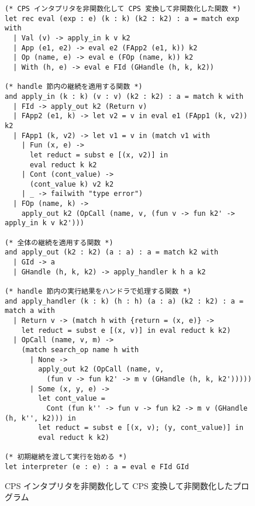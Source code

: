 \begin{figure}
\begin{spacing}{0.9}
\begin{verbatim}
(* CPS インタプリタを非関数化して CPS 変換して非関数化した関数 *)
let rec eval (exp : e) (k : k) (k2 : k2) : a = match exp with
  | Val (v) -> apply_in k v k2
  | App (e1, e2) -> eval e2 (FApp2 (e1, k)) k2
  | Op (name, e) -> eval e (FOp (name, k)) k2
  | With (h, e) -> eval e FId (GHandle (h, k, k2))

(* handle 節内の継続を適用する関数 *)
and apply_in (k : k) (v : v) (k2 : k2) : a = match k with
  | FId -> apply_out k2 (Return v)
  | FApp2 (e1, k) -> let v2 = v in eval e1 (FApp1 (k, v2)) k2
  | FApp1 (k, v2) -> let v1 = v in (match v1 with
    | Fun (x, e) ->
      let reduct = subst e [(x, v2)] in
      eval reduct k k2
    | Cont (cont_value) ->
      (cont_value k) v2 k2
    | _ -> failwith "type error")
  | FOp (name, k) ->
    apply_out k2 (OpCall (name, v, (fun v -> fun k2' -> apply_in k v k2')))

(* 全体の継続を適用する関数 *)
and apply_out (k2 : k2) (a : a) : a = match k2 with
  | GId -> a
  | GHandle (h, k, k2) -> apply_handler k h a k2

(* handle 節内の実行結果をハンドラで処理する関数 *)
and apply_handler (k : k) (h : h) (a : a) (k2 : k2) : a = match a with
  | Return v -> (match h with {return = (x, e)} ->
    let reduct = subst e [(x, v)] in eval reduct k k2)
  | OpCall (name, v, m) ->
    (match search_op name h with
      | None ->
        apply_out k2 (OpCall (name, v,
          (fun v -> fun k2' -> m v (GHandle (h, k, k2')))))
      | Some (x, y, e) ->
        let cont_value =
          Cont (fun k'' -> fun v -> fun k2 -> m v (GHandle (h, k'', k2))) in
        let reduct = subst e [(x, v); (y, cont_value)] in
        eval reduct k k2)

(* 初期継続を渡して実行を始める *)
let interpreter (e : e) : a = eval e FId GId
\end{verbatim}
\caption{CPS インタプリタを非関数化して CPS 変換して非関数化したプログラム}
\label{figure:4defun}
\end{spacing}
\end{figure}
